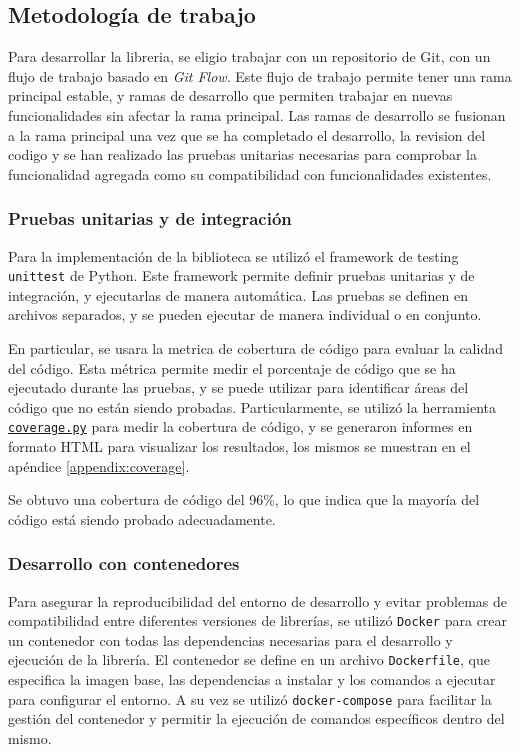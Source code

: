 \subsection{Metodología de trabajo}

Para desarrollar la libreria, se eligio trabajar con un repositorio de Git, con un flujo de trabajo basado en \textit{Git Flow}. Este flujo de trabajo permite tener una rama principal estable, y ramas de desarrollo que permiten trabajar en nuevas funcionalidades sin afectar la rama principal. Las ramas de desarrollo se fusionan a la rama principal una vez que se ha completado el desarrollo, la revision del codigo y se han realizado las pruebas unitarias necesarias para comprobar la funcionalidad agregada como su compatibilidad con funcionalidades existentes.

\subsubsection{Pruebas unitarias y de integración}

Para la implementación de la biblioteca se utilizó el framework de testing \texttt{unittest} de Python. Este framework permite definir pruebas unitarias y de integración, y ejecutarlas de manera automática. Las pruebas se definen en archivos separados, y se pueden ejecutar de manera individual o en conjunto.

En particular, se usara la metrica de cobertura de código para evaluar la calidad del código. Esta métrica permite medir el porcentaje de código que se ha ejecutado durante las pruebas, y se puede utilizar para identificar áreas del código que no están siendo probadas. Particularmente, se utilizó la herramienta \href{https://coverage.readthedocs.io/}{\texttt{coverage.py}} para medir la cobertura de código, y se generaron informes en formato HTML para visualizar los resultados, los mismos se muestran en el apéndice \ref{appendix:coverage}.

Se obtuvo una cobertura de código del 96\%, lo que indica que la mayoría del código está siendo probado adecuadamente.

\subsubsection{Desarrollo con contenedores}
Para asegurar la reproducibilidad del entorno de desarrollo y evitar problemas de compatibilidad entre diferentes versiones de librerías, se utilizó \texttt{Docker} \cite{docker} para crear un contenedor con todas las dependencias necesarias para el desarrollo y ejecución de la librería. El contenedor se define en un archivo \texttt{Dockerfile}, que especifica la imagen base, las dependencias a instalar y los comandos a ejecutar para configurar el entorno. A su vez se utilizó \texttt{docker-compose} \cite{docker_compose} para facilitar la gestión del contenedor y permitir la ejecución de comandos específicos dentro del mismo.

